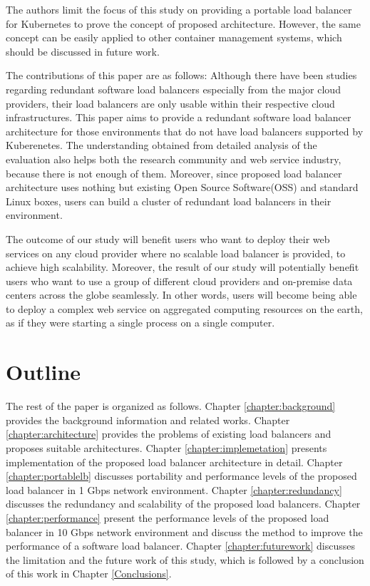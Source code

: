 The authors limit the focus of this study on providing a portable load balancer for Kubernetes to prove the concept of proposed architecture.
However, the same concept can be easily applied to other container management systems, which should be discussed in future work.

The contributions of this paper are as follows:
Although there have been studies regarding redundant software load balancers especially from the major cloud providers\cite{eisenbud2016maglev,patel2013ananta}, their load balancers are only usable within their respective cloud infrastructures.
This paper aims to provide a redundant software load balancer architecture for those environments that do not have load balancers supported by Kuberenetes.
The understanding obtained from detailed analysis of the evaluation also helps both the research community and web service industry, because there is not enough of them.
Moreover, since proposed load balancer architecture uses nothing but existing Open Source Software(OSS) and standard Linux boxes, users can build a cluster of redundant load balancers in their environment.

The outcome of our study will benefit users who want to deploy their web services on any cloud provider where no scalable load balancer is provided, to achieve high scalability.
Moreover, the result of our study will potentially benefit users who want to use a group of different cloud providers and on-premise data centers across the globe seamlessly.
In other words, users will become being able to deploy a complex web service on aggregated computing resources on the earth, as if they were starting a single process on a single computer.

\section{Outline}

The rest of the paper is organized as follows.
Chapter \ref{chapter:background} provides the background information and related works.
Chapter \ref{chapter:architecture} provides the problems of existing load balancers and proposes suitable architectures.
Chapter \ref{chapter:implemetation} presents implementation of the proposed load balancer architecture in detail.
Chapter \ref{chapter:portablelb} discusses portability and performance levels of the proposed load balancer in 1 Gbps network environment.
Chapter \ref{chapter:redundancy} discusses the redundancy and scalability of the proposed load balancers.
Chapter \ref{chapter:performance} present the performance levels of the proposed load balancer in 10 Gbps network environment and discuss the method to improve the performance of a software load balancer.
Chapter \ref{chapter:futurework} discusses the limitation and the future work of this study,
which is followed by a conclusion of this work in Chapter \ref{Conclusions}.





